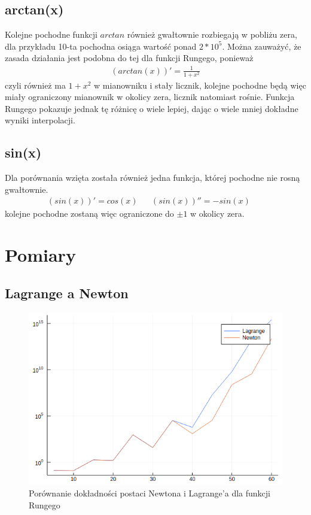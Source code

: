\documentclass[paper=a4, fontsize=11pt]{scrartcl} %
\numberwithin{equation}{section} %
\numberwithin{figure}{section} %
\numberwithin{table}{section} %
\begin{document}
\subsection{arctan(x)}
Kolejne pochodne funkcji $arctan$ również gwałtownie rozbiegają w pobliżu zera,
dla przykładu 10-ta pochodna osiąga wartość ponad $2*10^5$. Można zauważyć, 
że zasada działania jest podobna do tej dla funkcji Rungego, ponieważ 
\begin{align}
 (arctan(x))' = \frac{1}{1+x^2}
\end{align}
czyli również ma $1+x^2$ w mianowniku i stały licznik, kolejne pochodne będą więc
miały ograniczony mianownik w okolicy zera, licznik natomiast rośnie.
Funkcja Rungego pokazuje jednak tę różnicę o wiele lepiej, dając o wiele mniej
dokładne wyniki interpolacji.

\subsection{sin(x)}
Dla porównania wzięta została również jedna funkcja, której pochodne nie rosną gwałtownie.
\begin{align}
 (sin(x))' = cos(x) &&
 (sin(x))'' = -sin(x) &&
\end{align}
kolejne pochodne zostaną więc ograniczone do $\pm1$ w okolicy zera.

\section{Pomiary}

\subsection{Lagrange a Newton}

\begin{figure}[h!]
  \includegraphics[width=\linewidth]{lagnew.png}
  \caption{Porównanie dokładności postaci Newtona i Lagrange'a dla funkcji Rungego}
  \label{lagnew}
\end{figure} 
\end{document}
